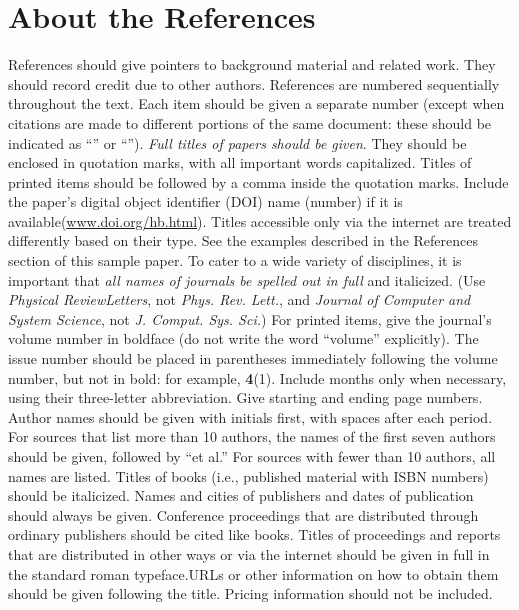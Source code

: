 \documentclass{article}
\begin{document}
\section{About the References}
References should give pointers to background material and related work. They should record credit due to other authors. 
References are numbered sequentially throughout the text. 
Each item should be given a separate number (except when citations are made to different portions of the same document: these should be indicated as {``}\cite[pp. 3--56]{text-a}{''} or {``}\cite[Chapter 14]{text-b}{''}). 
\textit{Full titles of papers should be given}. They should be enclosed in quotation marks, with all important words capitalized. Titles of printed items should be followed by a comma inside the quotation marks. Include the paper{'}s digital object identifier (DOI) name (number) if it is available(\url{www.doi.org/hb.html}). Titles accessible only via the internet are treated differently based on their type. See the examples described in the References section of this sample paper.
To cater to a wide variety of disciplines, it is important that \textit{all names of journals be spelled out in full} and italicized. (Use \textit{Physical ReviewLetters}, not\textit{ Phys. Rev. Lett.}, and \textit{Journal of Computer and System Science}, not \textit{J. Comput. Sys. Sci.}) 
For printed items, give the journal{'}s volume number in boldface (do not write the word {``}volume{''} explicitly). The issue number should be placed in parentheses immediately following the volume number, but not in bold: for example, \textbf{4}(1). Include months only when necessary, using their three-letter abbreviation. Give starting and ending page numbers.
Author names should be given with initials first, with spaces after each period. For sources that list more than 10 authors, the names of the first seven authors should be given, followed by {``}et al.{''} For sources with fewer than 10 authors, all names are listed.
Titles of books (i.e., published material with ISBN numbers) should be italicized. Names and cities of publishers and dates of publication should always be given. Conference proceedings that are distributed through ordinary publishers should be cited like books. 
Titles of proceedings and reports that are distributed in other ways or via the internet should be given in full in the standard roman typeface.URLs or other information on how to obtain them should be given following the title. Pricing information should not be included.
\end{document}
